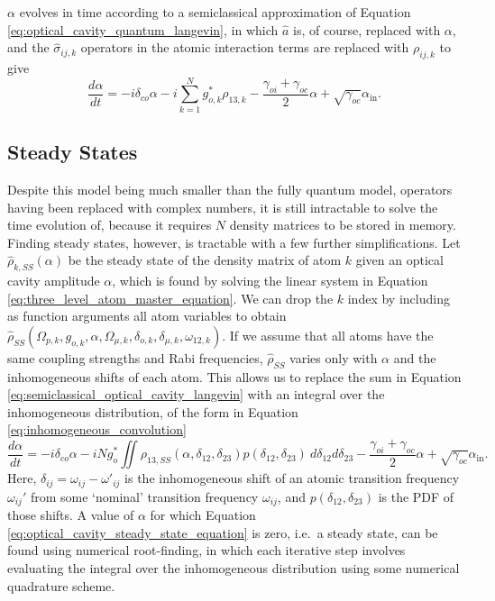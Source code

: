 $\alpha$ evolves in time according to a semiclassical approximation of Equation \ref{eq:optical_cavity_quantum_langevin}, in which $\hat{a}$ is, of course, replaced with $\alpha$, and the $\hat{\sigma}_{ij,k}$ operators in the atomic interaction terms are replaced with $\rho_{ij,k}$ to give
\begin{equation}
    \label{eq:semiclassical_optical_cavity_langevin}
    \frac{d\alpha}{dt} = -i\delta_{co}\alpha -i\sum_{k=1}^{N} g_{o,k}^* \rho_{13,k} - \frac{\gamma_{oi}+\gamma_{oc}}{2}\alpha + \sqrt{\gamma_{oc}}\alpha_\text{in}.
\end{equation}

\subsection{\label{subs:steady_states}Steady States}
Despite this model being much smaller than the fully quantum model, operators having been replaced with complex numbers, it is still intractable to solve the time evolution of, because it requires $N$ density matrices to be stored in memory. Finding steady states, however, is tractable with a few further simplifications. Let $\hat{\rho}_{k,SS}(\alpha)$ be the steady state of the density matrix of atom $k$ given an optical cavity amplitude $\alpha$, which is found by solving the linear system in Equation \ref{eq:three_level_atom_master_equation}. We can drop the $k$ index by including as function arguments all atom variables to obtain $\hat{\rho}_{SS}(\Omega_{p,k}, g_{o,k}, \alpha, \Omega_{\mu,k}, \delta_{o,k}, \delta_{\mu,k}, \omega_{12,k})$. If we assume that all atoms have the same coupling strengths and Rabi frequencies, $\hat{\rho}_{SS}$ varies only with $\alpha$ and the inhomogeneous shifts of each atom. This allows us to replace the sum in Equation \ref{eq:semiclassical_optical_cavity_langevin} with an integral over the inhomogeneous distribution, of the form in Equation \ref{eq:inhomogeneous_convolution}
\begin{equation}
    \label{eq:optical_cavity_steady_state_equation}
    \frac{d\alpha}{dt} = -i\delta_{co}\alpha -iNg_o^* \iint \rho_{13,SS}(\alpha, \delta_{12}, \delta_{23}) p(\delta_{12}, \delta_{23})\:d\delta_{12}d\delta_{23} - \frac{\gamma_{oi}+\gamma_{oc}}{2}\alpha + \sqrt{\gamma_{oc}}\alpha_\text{in}.
\end{equation}
Here, $\delta_{ij} = \omega_{ij} - \omega'_{ij}$ is the inhomogeneous shift of an atomic transition frequency $\omega_{ij}'$ from some `nominal' transition frequency $\omega_{ij}$, and $p(\delta_{12}, \delta_{23})$ is the PDF of those shifts. A value of $\alpha$ for which Equation \ref{eq:optical_cavity_steady_state_equation} is zero, i.e.\ a steady state, can be found using numerical root-finding, in which each iterative step involves evaluating the integral over the inhomogeneous distribution using some numerical quadrature scheme.

